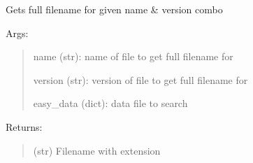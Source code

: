 \documentclass[letterpaper,10pt,english]{sphinxmanual}
\begin{document}
\begin{fulllineitems}
\label{api:pyi_updater.client.utils.get_filename}
Gets full filename for given name \& version combo

Args:
\begin{quote}

name (str): name of file to get full filename for

version (str): version of file to get full filename for

easy\_data (dict): data file to search
\end{quote}

Returns:
\begin{quote}

(str) Filename with extension
\end{quote}

\end{fulllineitems}

\label{api:module-pyi_updater.config}
\end{document}
